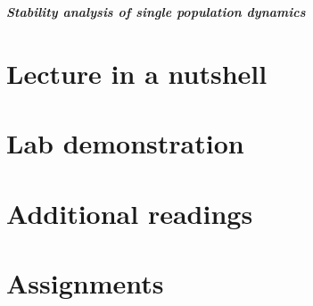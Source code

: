 \documentclass[
]{book}
\begin{document}
\textbf{\emph{Stability analysis of single population dynamics}}

\hypertarget{lecture-in-a-nutshell-3}{%
\section*{Lecture in a nutshell}\label{lecture-in-a-nutshell-3}}

\hypertarget{lab-demonstration-3}{%
\section*{Lab demonstration}\label{lab-demonstration-3}}

\hypertarget{additional-readings-3}{%
\section*{Additional readings}\label{additional-readings-3}}

\hypertarget{assignments-3}{%
\section*{Assignments}\label{assignments-3}}

  
\end{document}
